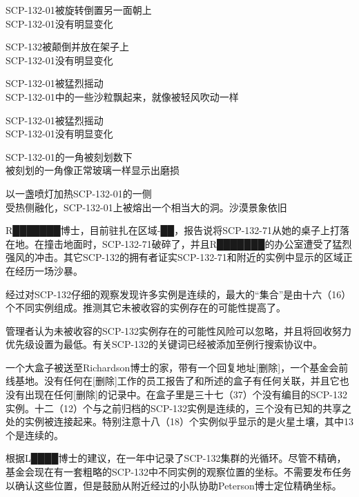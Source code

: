 \begin{scpbox}


SCP-132-01被旋转倒置另一面朝上\\
SCP-132-01没有明显变化

SCP-132被颠倒并放在架子上\\
SCP-132-01没有明显变化

SCP-132-01被猛烈摇动\\
SCP-132-01中的一些沙粒飘起来，就像被轻风吹动一样

SCP-132-01被猛烈摇动\\
SCP-132-01没有明显变化\\

SCP-132-01的一角被刻划数下\\
被刻划的一角像正常玻璃一样显示出磨损

以一盏喷灯加热SCP-132-01的一侧\\
受热侧融化，SCP-132-01上被熔出一个相当大的洞。沙漠景象依旧\\

\end{scpbox}

R███████博士，目前驻扎在区域-██，报告说将SCP-132-71从她的桌子上打落在地。在撞击地面时，SCP-132-71破碎了，并且R███████的办公室遭受了猛烈强风的冲击。其它SCP-132的拥有者证实SCP-132-71和附近的实例中显示的区域正在经历一场沙暴。

经过对SCP-132仔细的观察发现许多实例是连续的，最大的“集合”是由十六（16）个不同实例组成。推测其它未被收容的实例存在的可能性提高了。

管理者认为未被收容的SCP-132实例存在的可能性风险可以忽略，并且将回收努力优先级设置为最低。有关SCP-132的关键词已经被添加至例行搜索协议中。

一个大盒子被送至Richardson博士的家，带有一个回复地址{[}删除]，一个基金会前线基地。没有任何在{[}删除]工作的员工报告了和所述的盒子有任何关联，并且它也没有出现在任何{[}删除]的记录中。在盒子里是三十七（37）个没有编目的SCP-132实例。十二（12）个与之前归档的SCP-132实例是连续的，三个没有已知的共享之处的实例被连接起来。特别注意十八（18）个实例似乎显示的是火星土壤，其中13个是连续的。

根据L████博士的建议，在一年中记录了SCP-132集群的光循环。尽管不精确，基金会现在有一套粗略的SCP-132中不同实例的观察位置的坐标。不需要发布任务以确认这些位置，但是鼓励从附近经过的小队协助Peterson博士定位精确坐标。
